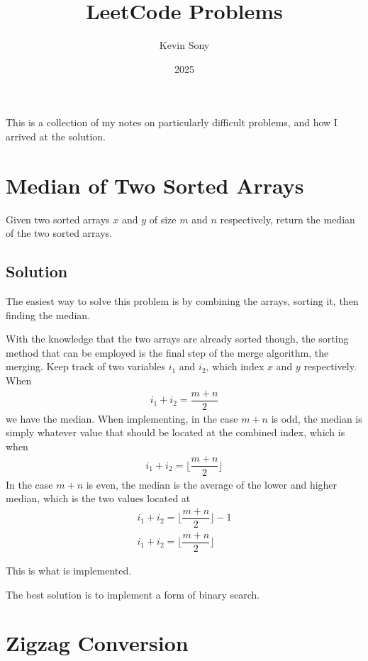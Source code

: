 \documentclass{article}
\title{LeetCode Problems}
\author{Kevin Sony}
\date{2025}
\newcommand{\floor}[1]{\lfloor #1 \rfloor}
\begin{document}
\maketitle

This is a collection of my notes on particularly difficult problems, and how I arrived at the solution.

\section*{Median of Two Sorted Arrays}

Given two sorted arrays $x$ and $y$ of size $m$ and $n$ respectively, return the median of the two sorted arrays.

\subsection*{Solution}

The easiest way to solve this problem is by combining the arrays, sorting it, then finding the median.

With the knowledge that the two arrays are already sorted though, the sorting method that can be employed is the final step of the merge algorithm, the merging. Keep track of two variables $i_1$ and $i_2$, which index $x$ and $y$ respectively. When
\begin{gather*}
i_1 + i_2 = \dfrac{m + n}{2}
\end{gather*}
we have the median. When implementing, in the case \( m + n \) is odd, the median is simply whatever value that should be located at the combined index, which is when
\begin{gather*}
i_1 + i_2 = \floor{ \dfrac{m + n}{2} }
\end{gather*}
In the case \( m + n \) is even, the median is the average of the lower and higher median, which is the two values located at
\begin{gather*}
i_1 + i_2 = \floor{ \dfrac{m + n}{2} } - 1\\
i_1 + i_2 = \floor{ \dfrac{m + n}{2} } 
\end{gather*}

This is what is implemented.

The best solution is to implement a form of binary search.

\section*{Zigzag Conversion}
\end{document}
